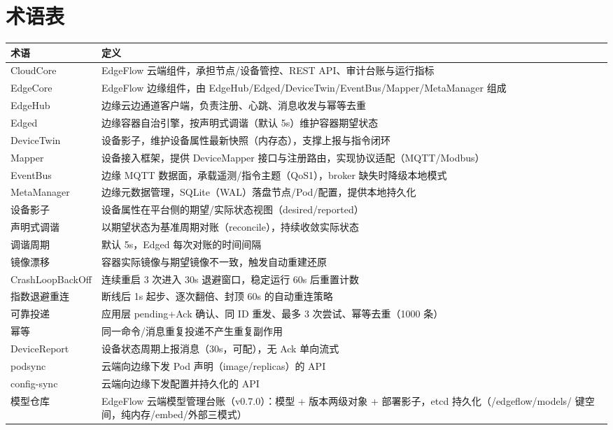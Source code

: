 \chapter{术语表}

{\setlength{\tabcolsep}{3pt}
\begin{longtable}{p{3.2cm}p{11.8cm}}
\toprule
术语 & 定义\\
\midrule
\endhead
\bottomrule
\endfoot
CloudCore & EdgeFlow 云端组件，承担节点/设备管控、REST API、审计台账与运行指标\\
EdgeCore & EdgeFlow 边缘组件，由 EdgeHub/Edged/DeviceTwin/EventBus/Mapper/MetaManager 组成\\
EdgeHub & 边缘云边通道客户端，负责注册、心跳、消息收发与幂等去重\\
Edged & 边缘容器自治引擎，按声明式调谐（默认 5s）维护容器期望状态\\
DeviceTwin & 设备影子，维护设备属性最新快照（内存态），支撑上报与指令闭环\\
Mapper & 设备接入框架，提供 DeviceMapper 接口与注册路由，实现协议适配（MQTT/Modbus）\\
EventBus & 边缘 MQTT 数据面，承载遥测/指令主题（QoS1），broker 缺失时降级本地模式\\
MetaManager & 边缘元数据管理，SQLite（WAL）落盘节点/Pod/配置，提供本地持久化\\
设备影子 & 设备属性在平台侧的期望/实际状态视图（desired/reported）\\
声明式调谐 & 以期望状态为基准周期对账（reconcile），持续收敛实际状态\\
调谐周期 & 默认 5s，Edged 每次对账的时间间隔\\
镜像漂移 & 容器实际镜像与期望镜像不一致，触发自动重建还原\\
CrashLoopBackOff & 连续重启 3 次进入 30s 退避窗口，稳定运行 60s 后重置计数\\
指数退避重连 & 断线后 1s 起步、逐次翻倍、封顶 60s 的自动重连策略\\
可靠投递 & 应用层 pending+Ack 确认、同 ID 重发、最多 3 次尝试、幂等去重（1000 条）\\
幂等 & 同一命令/消息重复投递不产生重复副作用\\
DeviceReport & 设备状态周期上报消息（30s，可配），无 Ack 单向流式\\
podsync & 云端向边缘下发 Pod 声明（image/replicas）的 API\\
config-sync & 云端向边缘下发配置并持久化的 API\\
模型仓库 & EdgeFlow 云端模型管理台账（v0.7.0）：模型 + 版本两级对象 + 部署影子，etcd 持久化（/edgeflow/models/ 键空间，纯内存/embed/外部三模式）\\

\end{longtable}}
